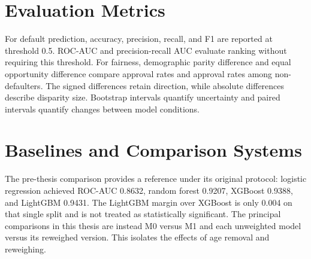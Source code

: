 \section{Evaluation Metrics}

For default prediction, accuracy, precision, recall, and F1 are reported at
threshold 0.5. ROC-AUC and precision-recall AUC evaluate ranking without
requiring this threshold. For fairness, demographic parity difference and
equal opportunity difference compare approval rates and approval rates among
non-defaulters. The signed differences retain direction, while absolute
differences describe disparity size. Bootstrap intervals quantify uncertainty
and paired intervals quantify changes between model conditions.

\section{Baselines and Comparison Systems}

The pre-thesis comparison provides a reference under its original protocol:
logistic regression achieved ROC-AUC 0.8632, random forest 0.9207, XGBoost
0.9388, and LightGBM 0.9431. The LightGBM margin over XGBoost is only 0.004
on that single split and is not treated as statistically significant. The
principal comparisons in this thesis are instead M0 versus M1 and each
unweighted model versus its reweighed version. This isolates the effects of
age removal and reweighing.
